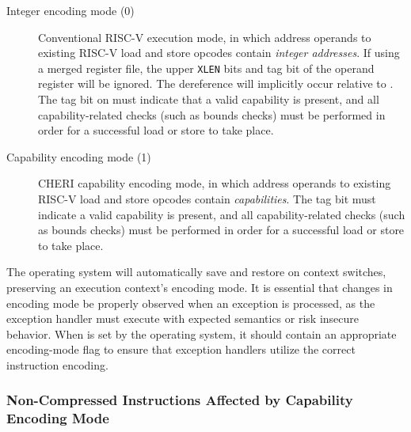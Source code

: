 \begin{description}
\item[Integer encoding mode (0)] Conventional RISC-V execution mode, in which
  address operands to existing RISC-V load and store opcodes contain
  \textit{integer addresses}.
  If using a merged register file, the upper \texttt{XLEN} bits and tag bit of
  the operand register will be ignored.
  The dereference will implicitly occur relative to \DDC{}.
  The tag bit on \DDC{} must indicate that a valid capability is present, and
  all capability-related checks (such as bounds checks) must be performed in
  order for a successful load or store to take place.

\item[Capability encoding mode (1)] CHERI capability encoding mode, in which address operands to
  existing RISC-V load and store opcodes contain \textit{capabilities}.
  The tag bit must indicate a valid capability is present, and all
  capability-related checks (such as bounds checks) must be performed in order
  for a successful load or store to take place.
\end{description}

The operating system will automatically save and restore \PCC{} on context
switches, preserving an execution context's encoding mode.
It is essential that changes in encoding mode be properly observed when an
exception is processed, as the exception handler must execute with expected
semantics or risk insecure behavior.
When \xTCC{} is set by the operating system, it should contain an appropriate
encoding-mode flag to ensure that exception handlers utilize the correct
instruction encoding.


%

\subsubsection{Non-Compressed Instructions Affected by Capability Encoding
  Mode}

